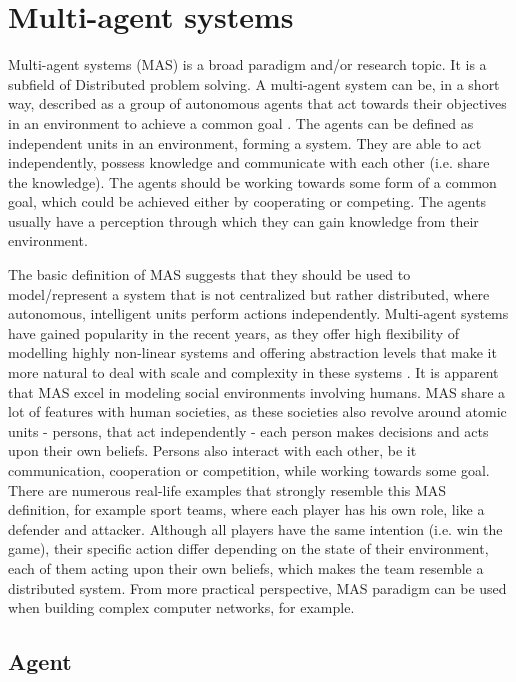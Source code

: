 \documentclass[main.tex]{subfiles}
\begin{document}
\section{Multi-agent systems} \label{mas}

Multi-agent systems (MAS) is a broad paradigm and/or research topic. It is a subfield of Distributed
problem solving. A multi-agent system can be, in a short way, described as a group
of autonomous agents that act towards their objectives in an environment to achieve a common goal
\cite{ParasumannaGokulan2010}. The agents can be defined as independent units in
an environment, forming a system. They are able to act independently, possess
knowledge and communicate with each other (i.e. share the knowledge). The agents
should be working towards some form of a common goal, which could be achieved
either by cooperating or competing.  The agents usually have a perception
through which they can gain knowledge from their environment.

The basic definition of MAS suggests that they should be used to model/represent
a system that is not centralized but rather distributed, where autonomous, intelligent units perform
actions independently. Multi-agent systems have gained popularity in the recent years, as they
offer high flexibility of modelling highly non-linear systems and offering abstraction levels that
make it more natural to deal with scale and complexity in these systems
\cite{Burmeister1997ApplicationOM}. It is apparent that MAS excel in modeling social environments
involving humans. MAS share a lot of features with human societies, as these societies also revolve
around atomic units - persons, that act independently - each person makes decisions and acts upon
their own beliefs. Persons also interact with each other, be it communication, cooperation or
competition, while working towards some goal. There are numerous real-life examples that strongly
resemble this MAS definition, for example sport teams, where each player has his own role, like
a defender and attacker. Although all players have the same intention (i.e. win the game), their
specific action differ depending on the state of their environment, each of them acting upon their
own beliefs, which makes the team resemble a distributed system. From more practical perspective,
MAS paradigm can be used when building complex computer networks, for example.

\subsection{Agent}
\end{document}
